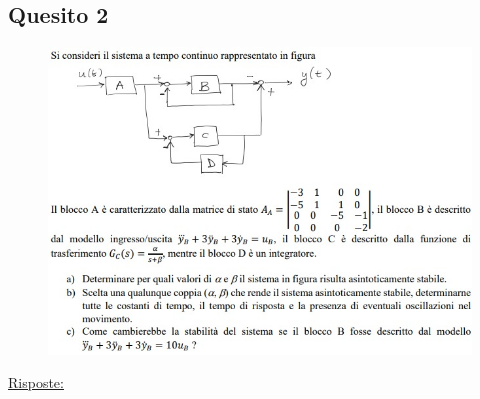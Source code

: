 \documentclass[a4paper]{report}
\begin{document}
\subsection*{Quesito 2}
\begin{figure}[h]
\includegraphics[width=\textwidth]{seconda_domanda}
\end{figure}
\underline{Risposte:}
\end{document}
